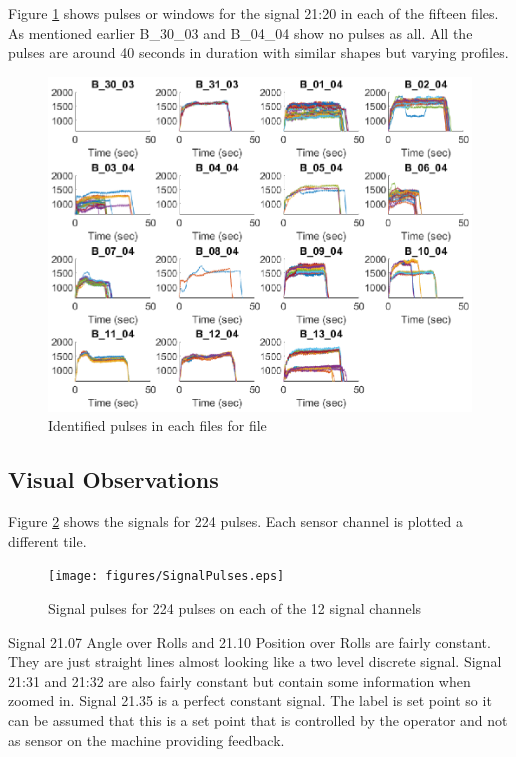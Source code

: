 \documentclass{article}
\begin{document}
Figure \ref{fig:IdentifiedPulses} shows pulses or windows for the signal 21:20 in each of the fifteen files. As mentioned earlier B\_30\_03 and B\_04\_04 show no pulses as all. All the pulses are around 40 seconds in duration with similar shapes but varying profiles.
 
\begin{figure}[H]
    \centering
    \includegraphics[width=\textwidth, height=\textheight, keepaspectratio]{figures/IdentifiedPulsesFig.eps}
    \caption{Identified pulses in each files for file}
    \label{fig:IdentifiedPulses}
\end{figure}

\subsection{Visual Observations}
Figure \ref{fig:SignalPulses} shows the signals for 224 pulses. Each sensor channel is plotted a different tile. 
\begin{figure}[H]
    \centering
    \texttt{[image: figures/SignalPulses.eps]}
    \caption{Signal pulses for 224 pulses on each of the 12 signal channels}
    \label{fig:SignalPulses}
\end{figure}

Signal 21.07 Angle over Rolls and 21.10 Position over Rolls are fairly constant. They are just straight lines almost looking like a two level discrete signal.
Signal 21:31 and 21:32 are also fairly constant but contain some information when zoomed in.
Signal 21.35 is a perfect constant signal. The label is set point so it can be assumed that this is a set point that is controlled by the operator and not as sensor on the machine providing feedback.
\end{document}
